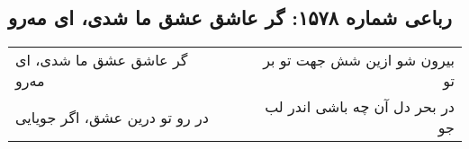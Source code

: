 \begin{center}
\section*{رباعی شماره ۱۵۷۸: گر عاشق عشق ما شدی، ای مه‌رو}
\label{sec:1578}
\begin{longtable}{l p{0.5cm} r}
گر عاشق عشق ما شدی، ای مه‌رو
&&
بیرون شو ازین شش جهت تو بر تو
\\
در رو تو درین عشق، اگر جویایی
&&
در بحر دل آن چه باشی اندر لب جو
\\
\end{longtable}
\end{center}
